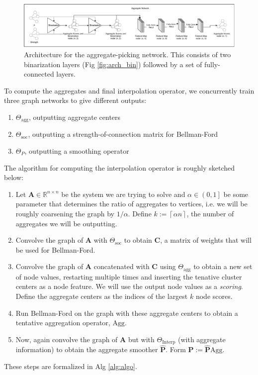 \documentclass{article}
\newcommand{\mat}[1]{\bm{{#1}}}
\newcommand{\ceil}[1]{\left\lceil #1 \right\rceil}
\begin{document}
\begin{figure}[h]
  \centering
  \includegraphics[width=\textwidth]{aggregate.pdf}
  \caption{Architecture for the aggregate-picking network.  This consists of two binarization layers (Fig \ref{fig:arch_bin}) followed by a set of fully-connected layers.}
  \label{fig:arch_agg}
\end{figure}

To compute the aggregates and final interpolation operator, we concurrently train three graph networks to give different outputs:
\begin{enumerate}
\item $\Theta_{\text{agg}}$, outputting aggregate centers
\item $\Theta_{\text{soc}}$, outputting a strength-of-connection matrix for Bellman-Ford
\item $\Theta_{P}$, outputting a smoothing operator
\end{enumerate}
The algorithm for computing the interpolation operator is roughly sketched below:
\begin{enumerate}
\item Let $\mat{A} \in \mathbb{R}^{n \times n}$ be the system we are trying to solve and $\alpha \in \left(0, 1\right]$ be some parameter that determines the ratio of aggregates to vertices, i.e. we will be roughly coarsening the graph by $1/\alpha$.  Define $k := \ceil{\alpha n}$, the number of aggregates we will be outputting.
\item Convolve the graph of $\mat{A}$ with $\Theta_{\text{soc}}$ to obtain $\mat{C}$, a matrix of weights that will be used for Bellman-Ford.
\item Convolve the graph of $\mat{A}$ concatenated with $\mat{C}$ using $\Theta_{\text{agg}}$ to obtain a new set of node values, restarting multiple times and inserting the tenative cluster centers as a node feature.  We will use the output node values as a \textit{scoring}.  Define the aggregate centers as the indices of the largest $k$ node scores.
\item Run Bellman-Ford on the graph with these aggregate centers to obtain a tentative aggregation operator, $\text{Agg}$.
\item Now, again convolve the graph of $\mat{A}$ but with $\Theta_{\text{Interp}}$ (with aggregate information) to obtain the aggregate smoother $\mat{\hat{P}}$.  Form $\mat{P} := \mat{\hat{P}}\text{Agg}$.
\end{enumerate}
These steps are formalized in Alg \ref{alg:algo}.
\end{document}
